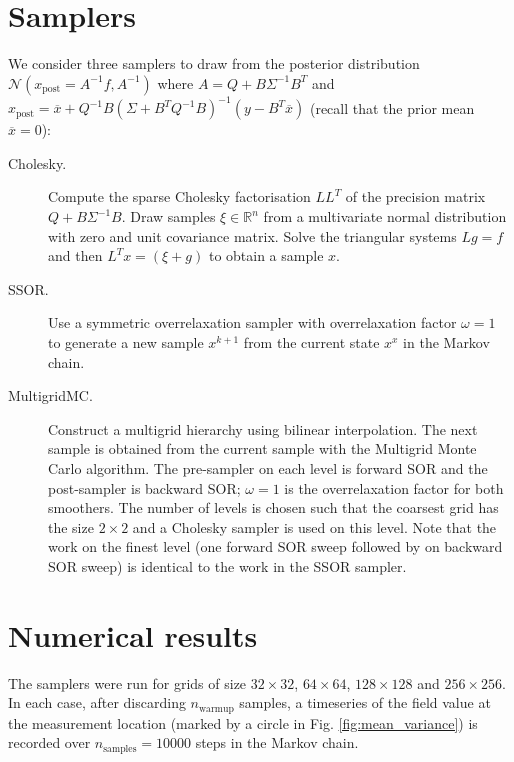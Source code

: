 \documentclass[11pt]{article}
\begin{document}
\section{Samplers}
We consider three samplers to draw from the posterior distribution $\mathcal{N}(x_{\text{post}}=A^{-1}f,A^{-1})$ where $A = Q + B\Sigma^{-1}B^T$ and $x_{\text{post}} = \overline{x} + Q^{-1}B(\Sigma + B^T Q^{-1}B)^{-1}(y-B^T\overline{x})$ (recall that the prior mean $\overline{x}=0$):
\begin{description}
    \item[Cholesky.] Compute the sparse Cholesky factorisation $LL^T$ of the precision matrix $Q+B\Sigma^{-1}B$. Draw samples $\xi\in\mathbb{R}^n$ from a multivariate normal distribution with zero and unit covariance matrix. Solve the triangular systems $Lg = f$ and then $L^T x = (\xi + g)$ to obtain a sample $x$.
    \item[SSOR.] Use a symmetric overrelaxation sampler with overrelaxation factor $\omega=1$ to generate a new sample $x^{k+1}$ from the current state $x^x$ in the Markov chain.
    \item[MultigridMC.] Construct a multigrid hierarchy using bilinear interpolation. The next sample is obtained from the current sample with the Multigrid Monte Carlo algorithm. The pre-sampler on each level is forward SOR and the post-sampler is backward SOR; $\omega=1$ is the overrelaxation factor for both smoothers. The number of levels is chosen such that the coarsest grid has the size $2\times 2$ and a Cholesky sampler is used on this level. Note that the work on the finest level (one forward SOR sweep followed by on backward SOR sweep) is identical to the work in the SSOR sampler.
\end{description}
\section{Numerical results}
The samplers were run for grids of size $32\times 32$, $64\times 64$, $128\times 128$ and $256\times 256$. In each case, after discarding $n_{\text{warmup}}$ samples, a timeseries of the field value at the measurement location (marked by a circle in Fig. \ref{fig:mean_variance}) is recorded over $n_{\text{samples}}=10000$ steps in the Markov chain.
\end{document}
